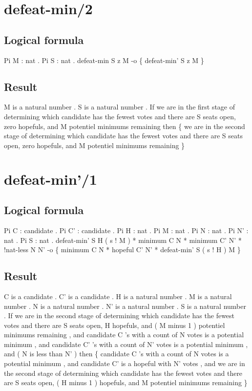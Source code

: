 \section{defeat-min/2}
\subsection{Logical formula}
\begin{texto2}
	Pi M : nat . Pi S : nat . defeat-min S z M -o \{ defeat-min' S z M \}
\end{texto2}

\subsection{Result}
\begin{texto2}
	M is a natural number . S is a natural number . If we are in the first stage of determining which candidate has the fewest votes and there are S seats open, zero hopefuls, and M potentiel minimums remaining then \{ we are in the second stage of determining which candidate has the fewest votes and there are S seats open, zero hopefuls, and M potentiel minimums remaining \}
\end{texto2}

\section{defeat-min'/1}
\subsection{Logical formula}
\begin{texto2}
	Pi C : candidate . Pi C' : candidate . Pi H : nat . Pi M : nat . Pi N : nat . Pi N' : nat . Pi S : nat . defeat-min' S H ( s ! M ) * minimum C N * minimum C' N' * !nat-less N N' -o \{ minimum C N * hopeful C' N' * defeat-min' S ( s ! H ) M \}
\end{texto2}

\subsection{Result}
\begin{texto2}
	C is a candidate . C' is a candidate . H is a natural number . M is a natural number . N is a natural number . N' is a natural number . S is a natural number . If we are in the second stage of determining which candidate has the fewest votes and there are S seats open, H hopefuls, and ( M minus 1 ) potentiel minimums remaining , and candidate C 's with a count of N votes is a potential minimum , and candidate C' 's with a count of N' votes is a potential minimum , and ( N is less than N' ) then \{ candidate C 's with a count of N votes is a potential minimum , and candidate C' is a hopeful with N' votes , and we are in the second stage of determining which candidate has the fewest votes and there are S seats open, ( H minus 1 ) hopefuls, and M potentiel minimums remaining \}
\end{texto2}

